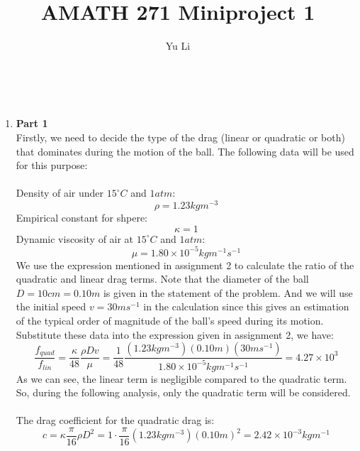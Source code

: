 \documentclass{article}
\title{AMATH 271 Miniproject 1}
\author{Yu Li}
\begin{document}
\maketitle
\text{ }\\
\begin{enumerate}
  \item \textbf{Part 1}\\
  Firstly, we need to decide the type of the drag (linear or quadratic or both) that dominates during the motion of the ball. The following data will be used for this purpose:\\
  \\
  Density of air under \(15 ^\circ C\) and \(1 atm\)\cite{airdensity}:
  \begin{equation}
  \rho =   1.23 kg m^{-3}
  \end{equation}
  Empirical constant for shpere:
  \begin{equation}
    \kappa  = 1
  \end{equation}
  Dynamic viscosity of air at \(15 ^\circ C\) and \(1 atm\)\cite{viscosity}:
  \begin{equation}
    \mu  = 1.80 \times 10^{-5} kg m^{-1}s^{-1}
  \end{equation}
  We use the expression mentioned in assignment 2 to calculate the ratio of the quadratic and linear drag terms.
  Note that the diameter of the ball \(D= 10 cm = 0.10 m\) is given in the statement of the problem.
  And we will use the initial speed \(v=30ms^{-1}\) in the calculation since this gives an estimation of the typical order of magnitude of the ball's speed during its motion. Substitute these data into the expression given in assignment 2, we have:\\
  \begin{equation}
    \frac{f_{quad}}{f_{lin}} = \frac{\kappa}{48}\frac{\rho D v}{\mu} = \frac{1}{48} \frac{(1.23 kg m^{-3})( 0.10 m)(30ms^{-1})}{1.80 \times 10^{-5} kg m^{-1}s^{-1}} = 4.27\times 10^3
  \end{equation}
  As we can see, the linear term is negligible compared to the quadratic term. So, during the following analysis, only the quadratic term will be considered. \\
  \\
  The drag coefficient for the quadratic drag is:
  \begin{equation}
    c = \kappa \frac{\pi}{16}\rho D^2 = 1\cdot \frac{\pi}{16} (1.23 kg m^{-3}) (0.10m)^2 =2.42\times 10^{-3} kg m^{-1}
  \end{equation}

\end{enumerate}
\end{document}

